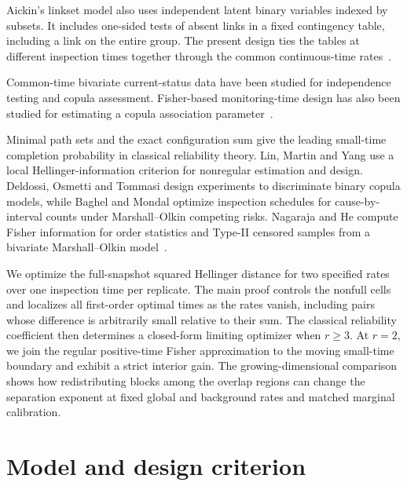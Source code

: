 \documentclass[11pt]{article}
\begin{document}
Aickin's linkset model also uses independent latent binary variables indexed by subsets. It includes one-sided tests of absent links in a fixed contingency table, including a link on the entire group. The present design ties the tables at different inspection times together through the common continuous-time rates~\cite{aickin2010}.

Common-time bivariate current-status data have been studied for independence testing and copula assessment. Fisher-based monitoring-time design has also been studied for estimating a copula association parameter~\cite{ding2004,jewell2005,liu2007}.

Minimal path sets and the exact configuration sum give the leading small-time completion probability in classical reliability theory. Lin, Martin and Yang use a local Hellinger-information criterion for nonregular estimation and design. Deldossi, Osmetti and Tommasi design experiments to discriminate binary copula models, while Baghel and Mondal optimize inspection schedules for cause-by-interval counts under Marshall--Olkin competing risks. Nagaraja and He compute Fisher information for order statistics and Type-II censored samples from a bivariate Marshall--Olkin model~\cite{marichal2016,lin2019,deldossi2019,baghel2024,nagaraja2015}.

We optimize the full-snapshot squared Hellinger distance for two specified rates over one inspection time per replicate. The main proof controls the nonfull cells and localizes all first-order optimal times as the rates vanish, including pairs whose difference is arbitrarily small relative to their sum. The classical reliability coefficient then determines a closed-form limiting optimizer when \(r\ge3\). At \(r=2\), we join the regular positive-time Fisher approximation to the moving small-time boundary and exhibit a strict interior gain. The growing-dimensional comparison shows how redistributing blocks among the overlap regions can change the separation exponent at fixed global and background rates and matched marginal calibration.

\section{Model and design criterion}\label{model-and-design-criterion}
\end{document}
